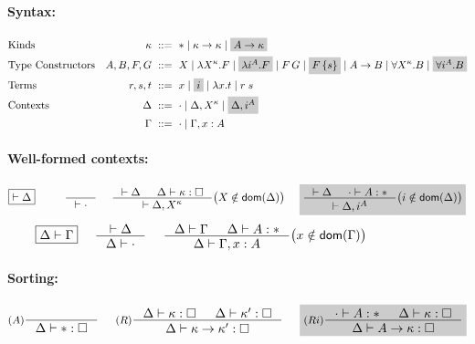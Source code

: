 \begin{figure}
\begin{framed}
\paragraph{Syntax:}
\begin{align*}
\!\!\!\!\!\!\!\!&\text{Kinds}
 	& \kappa		&~ ::= ~ *
				\mid \kappa -> \kappa
				\mid \newFi{A -> \kappa}
\\
\!\!\!\!\!\!\!\!&\text{Type Constructors}
	& A,B,F,G		&~ ::= ~ X
				\mid \lambda X^\kappa.F
				\mid \newFi{\lambda i^A.F}
				\mid F\,G
				\mid \newFi{F\,\{s\}}
				\mid A -> B
				\mid \forall X^\kappa . B
				\mid \newFi{\forall i^A . B}
\\
\!\!\!\!\!\!\!\!&\text{Terms}
	& r,s,t			&~ ::= ~ x \mid \newFi{i}
                                \mid \lambda x.t \mid r\;s
\\
\!\!\!\!\!\!\!\!&\text{Contexts}
	& \Delta		&~ ::= ~ \cdot
				\mid \Delta, X^\kappa
				\mid \newFi{\Delta, i^A} \\
&	& \Gamma		&~ ::= ~ \cdot
				\mid \Gamma, x : A
\end{align*}

\paragraph{Well-formed contexts:}
\[ \fbox{$|- \Delta$}
 ~~~~ ~~~~
   \inference{}{|- \cdot}
 ~~~~
   \inference{|- \Delta & \Delta |- \kappa:\square}
             {|- \Delta,X^\kappa}
      \big( X\notin\dom(\Delta) \big)
 ~~~~ \newFi{
   \inference{|- \Delta & \cdot |- A:*}
             {|- \Delta,i^A}
      \big( i\notin\dom(\Delta) \big) }
\]
\[ \fbox{$\Delta |- \Gamma$}
 ~~~~
   \inference{|- \Delta}{\Delta |- \cdot}
 ~~~~
   \inference{\Delta |- \Gamma & \Delta |- A:*}
             {\Delta |- \Gamma,x:A}
      \big( x\notin\dom(\Gamma) \big)
\]


\paragraph{Sorting:} \fbox{$\Delta |- \kappa : \square$}
\[ \inference[($A$)]{}{\Delta |- *:\square}
 ~~~~
   \inference[($R$)]{\Delta |- \kappa:\square & \Delta |- \kappa':\square}
                    {\Delta |- \kappa -> \kappa' : \square}
 ~~~~
   \newFi{
   \inference[($Ri$)]{\cdot |- A:* & \Delta |- \kappa:\square}
                     {\Delta |- A -> \kappa : \square} }
\]


\end{framed}
\end{figure}
